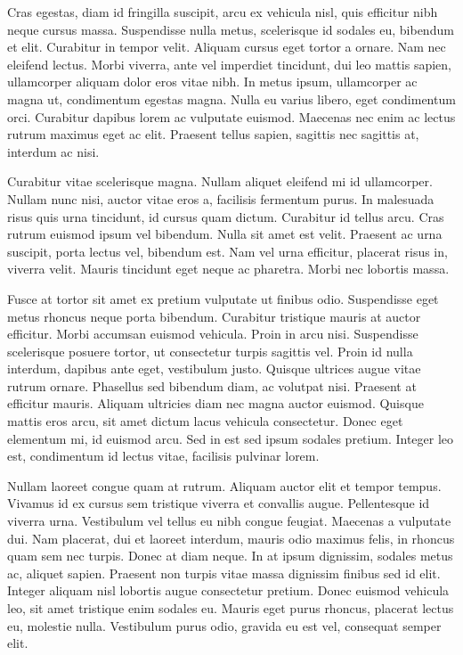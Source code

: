 \documentclass{article}
\begin{document}
Cras egestas, diam id fringilla suscipit, arcu ex vehicula nisl, quis efficitur nibh neque cursus massa. Suspendisse nulla metus, scelerisque id sodales eu, bibendum et elit. Curabitur in tempor velit. Aliquam cursus eget tortor a ornare. Nam nec eleifend lectus. Morbi viverra, ante vel imperdiet tincidunt, dui leo mattis sapien, ullamcorper aliquam dolor eros vitae nibh. In metus ipsum, ullamcorper ac magna ut, condimentum egestas magna. Nulla eu varius libero, eget condimentum orci. Curabitur dapibus lorem ac vulputate euismod. Maecenas nec enim ac lectus rutrum maximus eget ac elit. Praesent tellus sapien, sagittis nec sagittis at, interdum ac nisi.

Curabitur vitae scelerisque magna. Nullam aliquet eleifend mi id ullamcorper. Nullam nunc nisi, auctor vitae eros a, facilisis fermentum purus. In malesuada risus quis urna tincidunt, id cursus quam dictum. Curabitur id tellus arcu. Cras rutrum euismod ipsum vel bibendum. Nulla sit amet est velit. Praesent ac urna suscipit, porta lectus vel, bibendum est. Nam vel urna efficitur, placerat risus in, viverra velit. Mauris tincidunt eget neque ac pharetra. Morbi nec lobortis massa.

Fusce at tortor sit amet ex pretium vulputate ut finibus odio. Suspendisse eget metus rhoncus neque porta bibendum. Curabitur tristique mauris at auctor efficitur. Morbi accumsan euismod vehicula. Proin in arcu nisi. Suspendisse scelerisque posuere tortor, ut consectetur turpis sagittis vel. Proin id nulla interdum, dapibus ante eget, vestibulum justo. Quisque ultrices augue vitae rutrum ornare. Phasellus sed bibendum diam, ac volutpat nisi. Praesent at efficitur mauris. Aliquam ultricies diam nec magna auctor euismod. Quisque mattis eros arcu, sit amet dictum lacus vehicula consectetur. Donec eget elementum mi, id euismod arcu. Sed in est sed ipsum sodales pretium. Integer leo est, condimentum id lectus vitae, facilisis pulvinar lorem.

Nullam laoreet congue quam at rutrum. Aliquam auctor elit et tempor tempus. Vivamus id ex cursus sem tristique viverra et convallis augue. Pellentesque id viverra urna. Vestibulum vel tellus eu nibh congue feugiat. Maecenas a vulputate dui. Nam placerat, dui et laoreet interdum, mauris odio maximus felis, in rhoncus quam sem nec turpis. Donec at diam neque. In at ipsum dignissim, sodales metus ac, aliquet sapien. Praesent non turpis vitae massa dignissim finibus sed id elit. Integer aliquam nisl lobortis augue consectetur pretium. Donec euismod vehicula leo, sit amet tristique enim sodales eu. Mauris eget purus rhoncus, placerat lectus eu, molestie nulla. Vestibulum purus odio, gravida eu est vel, consequat semper elit.
\end{document}
